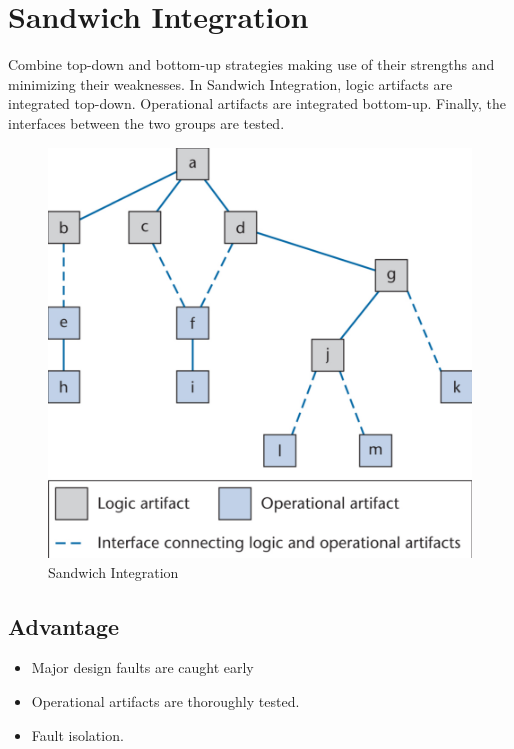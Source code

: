 \documentclass[11pt]{article}
\begin{document}
\newpage
\section*{Sandwich Integration}

Combine top-down and bottom-up strategies making use of their strengths and minimizing their weaknesses. In Sandwich Integration, logic artifacts are integrated top-down. Operational artifacts are integrated bottom-up. Finally, the interfaces between the two groups are tested.

\begin{figure}[h]
	\centering
	\includegraphics[width=0.6\linewidth]{images/Sandwich.png}
	\caption{Sandwich Integration}
	\label{fig:Sandwich}
\end{figure}

\subsection*{Advantage}

\begin{itemize}
	\item
	
	Major design faults are caught early

	\item 
	
	Operational artifacts are thoroughly tested.

	\item
	
	Fault isolation.
	
\end{itemize}
\end{document}
